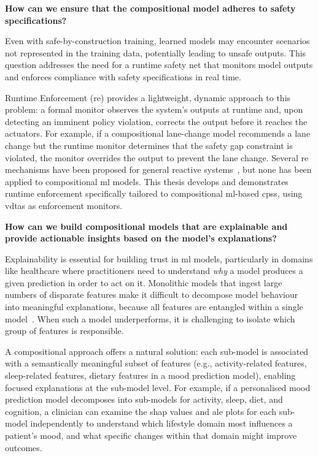 \begin{questions}
\item \textbf{How can we ensure that the compositional model adheres to safety specifications?}
\label{rq:runtime_enforcement}

Even with safe-by-construction training, learned models may encounter scenarios not represented in the training data, potentially leading to unsafe outputs. This question addresses the need for a runtime safety net that monitors model outputs and enforces compliance with safety specifications in real time.

Runtime Enforcement (\gls{re}) provides a lightweight, dynamic approach to this problem: a formal monitor observes the system's outputs at runtime and, upon detecting an imminent policy violation, corrects the output before it reaches the actuators. For example, if a compositional lane-change model recommends a lane change but the runtime monitor determines that the safety gap constraint is violated, the monitor overrides the output to prevent the lane change. Several \gls{re} mechanisms have been proposed for general reactive systems~\cite{10.1145/353323.353382, 10.1007/s10207-004-0046-8, 10.1145/3092282.3092291, pearce_smart_2020}, but none has been applied to compositional \gls{ml} models. This thesis develops and demonstrates runtime enforcement specifically tailored to compositional \gls{ml}-based \glspl{cps}, using \glspl{vdta} as enforcement monitors.


\item \textbf{How can we build compositional models that are explainable and provide actionable insights based on the model's explanations?}
\label{rq:explainability}

Explainability is essential for building trust in \gls{ml} models, particularly in domains like healthcare where practitioners need to understand \emph{why} a model produces a given prediction in order to act on it. Monolithic models that ingest large numbers of disparate features make it difficult to decompose model behaviour into meaningful explanations, because all features are entangled within a single model~\cite{byeon_advances_2023}. When such a model underperforms, it is challenging to isolate which group of features is responsible.

A compositional approach offers a natural solution: each sub-model is associated with a semantically meaningful subset of features (e.g., activity-related features, sleep-related features, dietary features in a mood prediction model), enabling focused explanations at the sub-model level. For example, if a personalised mood prediction model decomposes into sub-models for activity, sleep, diet, and cognition, a clinician can examine the \gls{shap} values and \gls{ale} plots for each sub-model independently to understand which lifestyle domain most influences a patient's mood, and what specific changes within that domain might improve outcomes.


\end{questions}
